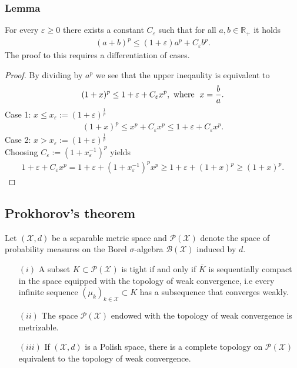 \documentclass[11pt,a4paper]{article}
\begin{document}
\subsubsection{Lemma}
For every $\varepsilon\geq{}0$ there exists a constant $C_\varepsilon$ such that for all $a,b\in\mathbb{R_+}$ it holds
\begin{align*}
(a+b)^p \leq (1+\varepsilon)a^p + C_\varepsilon{}b^p.
\end{align*} 
The proof to this requires a differentiation of cases.
\begin{proof}
By dividing by $a^p$ we see that the upper ineqaulity is equivalent to 
\begin{align*}
(1+x)^p\leq{}1+\varepsilon+C_{\varepsilon}x^p, \,\,\text{where } \hspace{0.3em}x=\frac{b}{a}.
\end{align*}
Case 1: $x\leq{}x_{\varepsilon}:=(1+\varepsilon)^{\frac{1}{p}}$
\begin{align*}
(1+x)^p \leq x^p+C_{\varepsilon}x^p \leq 1+\varepsilon + C_{\varepsilon}x^p.
\end{align*}
Case 2: $x>x_{\varepsilon}:=(1+\varepsilon)^{\frac{1}{p}}$\vspace{0.45em}\\
Choosing $C_{\varepsilon}:=(1+x_{\varepsilon}^{-1})^p$ yields
\begin{align*}
1+\varepsilon + C_{\varepsilon}x^p = 1+\varepsilon + (1+x_{\varepsilon}^{-1})^px^p \geq 1+\varepsilon+(1+x)^p\geq{}(1+x)^p.
\end{align*}
\end{proof}
\subsection{Prokhorov's theorem}
Let $(\mathcal{X},d)$ be a separable metric space and $\mathcal{P(X)}$ denote the space of probability measures on the Borel $\sigma$-algebra $\mathcal{B(X)}$ induced by $d$.
\begin{itemize}
\item[$(i)$] A subset $K\subset{}\mathcal{P(X)}$ is tight if and only if $\overline{K}$ is sequentially compact in the space equipped with the topology of weak convergence, i.e every infinite sequence $(\mu_k)_{k\in\mathcal{X}}\subset{}K$ has a subsequence that converges weakly.
\item[$(ii)$] The space $\mathcal{P(X)}$ endowed with the topology of weak convergence is metrizable.
\item[$(iii)$] If $(\mathcal{X},d)$ is a Polish space, there is a complete topology on $\mathcal{P(X)}$ equivalent to the topology of weak convergence.
\end{itemize}
\end{document}
